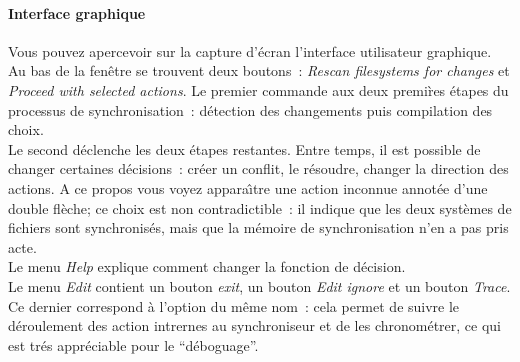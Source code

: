 \documentclass[11pt]{report}
\begin{document}
{\paragraph{Interface graphique\\}
Vous pouvez apercevoir sur la capture d'\'ecran l'interface utilisateur
graphique. Au bas de la fen\^etre se trouvent deux boutons~:
\emph{Rescan filesystems for changes} et \emph{Proceed with selected actions}.
Le premier commande aux deux premi\`res \'etapes du processus de
synchronisation~: d\'etection des changements puis compilation des choix.\\
Le second d\'eclenche les deux \'etapes restantes.
Entre temps, il est possible de changer certaines d\'ecisions~: cr\'eer un
conflit, le r\'esoudre, changer la direction des actions. A ce propos vous 
voyez appara\^{\i}tre une action inconnue annot\'ee d'une double fl\`eche; 
ce choix est non contradictible~: il indique que les deux syst\`emes de 
fichiers sont synchronis\'es, mais que la m\'emoire de synchronisation 
n'en a pas pris acte.\\
Le menu \emph{Help} explique comment changer la fonction de d\'ecision.\\
Le menu \emph{Edit} contient un bouton \emph{exit}, un bouton 
\emph{Edit ignore} et un bouton \emph{Trace}. Ce dernier correspond \`a l'option du
m\^eme nom~: cela permet de suivre le d\'eroulement des action intrernes au
synchroniseur et de les chronom\'etrer, ce qui est tr\'es appr\'eciable pour 
le ``d\'eboguage''.
}
\end{document}
